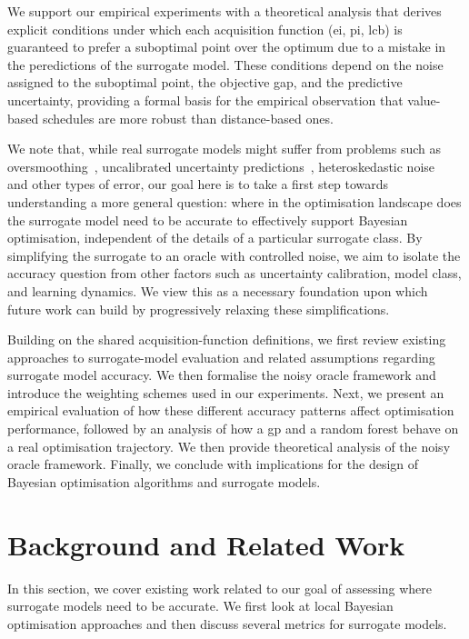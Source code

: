 We support our empirical experiments with a theoretical analysis that derives explicit conditions under which each acquisition function (\gls{ei}, \gls{pi}, \gls{lcb}) is guaranteed to prefer a suboptimal point over the optimum due to a mistake in the peredictions of the surrogate model. These conditions depend on the noise assigned to the suboptimal point, the objective gap, and the predictive uncertainty, providing a formal basis for the empirical observation that value-based schedules are more robust than distance-based ones.

We note that, while real surrogate models might suffer from problems such as oversmoothing~\citep{HvaEtAl24}, uncalibrated uncertainty predictions~\citep{FolEtAl23b}, heteroskedastic noise~\citep{CowEtAl22} and other types of error, our goal here is to take a first step towards understanding a more general question: where in the optimisation landscape does the surrogate model need to be accurate to effectively support Bayesian optimisation, independent of the details of a particular surrogate class. By simplifying the surrogate to an oracle with controlled noise, we aim to isolate the accuracy question from other factors such as uncertainty calibration, model class, and learning dynamics. We view this as a necessary foundation upon which future work can build by progressively relaxing these simplifications.

Building on the shared acquisition-function definitions, we first review existing approaches to surrogate-model evaluation and related assumptions regarding surrogate model accuracy. We then formalise the noisy oracle framework and introduce the weighting schemes used in our experiments. Next, we present an empirical evaluation of how these different accuracy patterns affect optimisation performance, followed by an analysis of how a \gls{gp} and a random forest behave on a real optimisation trajectory. We then provide theoretical analysis of the noisy oracle framework. Finally, we conclude with implications for the design of Bayesian optimisation algorithms and surrogate models.

\section{Background and Related Work}
In this section, we cover existing work related to our goal of assessing where surrogate models need to be accurate. We first look at local Bayesian optimisation approaches and then discuss several metrics for surrogate models.

